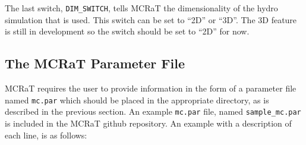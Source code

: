 \documentclass[12pt,a4paper]{article}
\begin{document}
The last switch, \texttt{DIM\_SWITCH}, tells MCRaT the dimensionality of the hydro simulation that is used. This switch can be set to ``2D'' or ``3D''. The 3D feature is still in development so the switch should be set to ``2D'' for now.


\subsection{The MCRaT Parameter File} \label{mc.par}
MCRaT requires the user to provide information in the form of a parameter file named \texttt{mc.par} which should be placed in the appropriate directory, as is described in the previous section. An example \texttt{mc.par} file, named \texttt{sample\_mc.par} is included in the MCRaT github repository. An example with a description of each line, is as follows:\\
\end{document}
